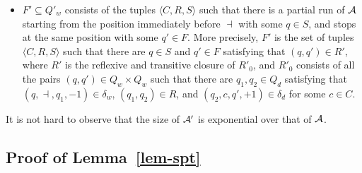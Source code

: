 {\begin{itemize}
\begin{itemize}
\begin{itemize}
\item $c'=\bigwedge \limits_{c \in C} c \wedge \bigwedge \limits_{c \in \Cc_\cA \setminus C} \overline{c}$, 
\item $R'$ is the reflexive and transitive closure of $R'_0$, where $R'_0$ consists of all the pairs $(q,q') \in Q_d \times Q_d$ such that there are $q_1,q_2 \in Q_w$ satisfying that $(q,c,q_1,-1) \in \delta_d$ for some $c \in C$, $(q_1,q_2) \in R$, and $(q_2,a,q',+1) \in \delta_w$, 
\item $S'=\{q' \in Q_w \mid \exists q \in S, q_1 \in Q_d.\ (q,q_1) \in R', (q_1,c,q',+1) \in \delta_d \mbox{ for some } c \in C\}$.
\end{itemize}
%
\item Let $\langle C,R,S\rangle \in Q'_w$ and $\langle a,R',S'\rangle \in Q'_d$. Then $\delta'_w(\langle C,R,S \rangle, a)=\langle a, R',S'\rangle$ iff the following conditions hold, 
\begin{itemize}
\item $R'$ is the reflexive and transitive closure of $R'_0$, where $R'_0$ consists of all the pairs $(q,q') \in Q_w \times Q_w$ such that there are $q_1,q_2 \in Q_d$ satisfying that $(q,a,q_1,-1) \in \delta_w$, $(q_1,q_2) \in R$, and $(q_2,c,q',+1) \in \delta_d$ for some $c \in C$, 
\item $S'=\{q' \in Q_d \mid \exists q \in S, q_1 \in Q_w.\ (q,q_1) \in R', (q_1,a,q',+1) \in \delta_w\}$.
\end{itemize}
%
\end{itemize}
%
\item $F' \subseteq Q'_w$ consists of the tuples $\langle C, R, S\rangle$ such that there is a partial run of $\mathcal{A}$ starting from the position immediately before $\dashv$ with some $q \in S$, and stops at the same position with some $q' \in F$. More precisely, $F'$ is the set of tuples $\langle C, R, S\rangle$ such that there are $q \in S$ and $q' \in F$ satisfying that $(q,q') \in R'$, where $R'$ is the reflexive and transitive closure of $R'_0$, and $R'_0$ consists of all the pairs $(q,q') \in Q_w \times Q_w$ such that there are $q_1,q_2 \in Q_d$ satisfying that $(q,\dashv,q_1,-1) \in \delta_w$, $(q_1,q_2) \in R$, and $(q_2,c,q',+1) \in \delta_d$ for some $c \in C$.
\end{itemize}
It is not hard to observe that the size of $\mathcal{A}'$ is exponential over that of $\mathcal{A}$.
}

\subsection{Proof of Lemma~\ref{lem-spt}}
